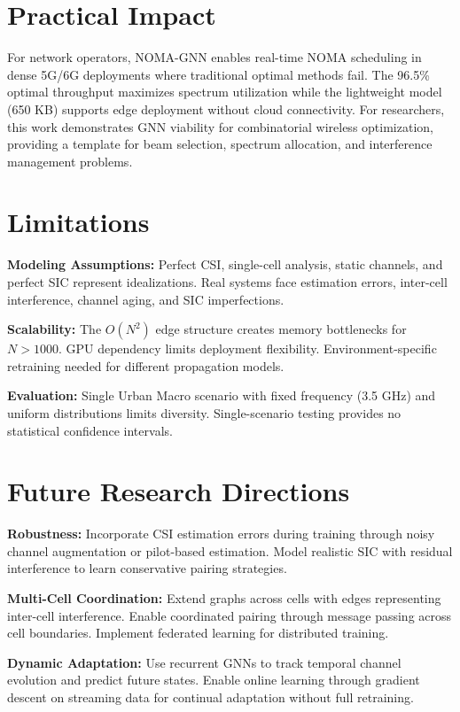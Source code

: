 \section{Practical Impact}

For network operators, NOMA-GNN enables real-time NOMA scheduling in dense 5G/6G deployments where traditional optimal methods fail. The 96.5\% optimal throughput maximizes spectrum utilization while the lightweight model (650 KB) supports edge deployment without cloud connectivity. For researchers, this work demonstrates GNN viability for combinatorial wireless optimization, providing a template for beam selection, spectrum allocation, and interference management problems.

\section{Limitations}

\textbf{Modeling Assumptions:} Perfect CSI, single-cell analysis, static channels, and perfect SIC represent idealizations. Real systems face estimation errors, inter-cell interference, channel aging, and SIC imperfections.

\textbf{Scalability:} The $O(N^2)$ edge structure creates memory bottlenecks for $N > 1000$. GPU dependency limits deployment flexibility. Environment-specific retraining needed for different propagation models.

\textbf{Evaluation:} Single Urban Macro scenario with fixed frequency (3.5 GHz) and uniform distributions limits diversity. Single-scenario testing provides no statistical confidence intervals.

\section{Future Research Directions}

\textbf{Robustness:} Incorporate CSI estimation errors during training through noisy channel augmentation or pilot-based estimation. Model realistic SIC with residual interference to learn conservative pairing strategies.

\textbf{Multi-Cell Coordination:} Extend graphs across cells with edges representing inter-cell interference. Enable coordinated pairing through message passing across cell boundaries. Implement federated learning for distributed training.

\textbf{Dynamic Adaptation:} Use recurrent GNNs to track temporal channel evolution and predict future states. Enable online learning through gradient descent on streaming data for continual adaptation without full retraining.

